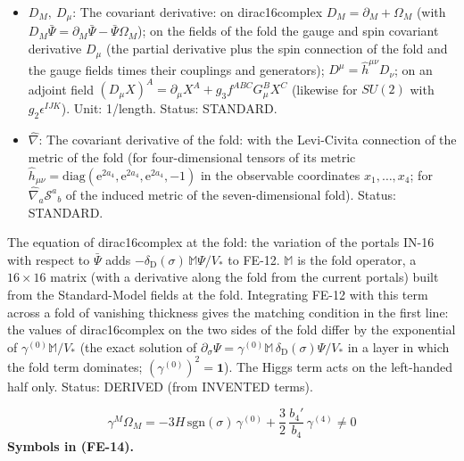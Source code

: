 \documentclass[
  10pt,
]{article}
\begin{document}
\begin{itemize}
\item
  \(D_M,\ D_\mu\): The covariant derivative: on dirac16complex
  \(D_M = \partial_M + \Omega_M\) (with
  \(D_M\bar\Psi = \partial_M\bar\Psi - \bar\Psi\Omega_M\)); on the
  fields of the fold the gauge and spin covariant derivative \(D_\mu\)
  (the partial derivative plus the spin connection of the fold and the
  gauge fields times their couplings and generators);
  \(D^\mu = \hat h^{\mu\nu}D_\nu\); on an adjoint field
  \((D_\mu X)^A = \partial_\mu X^A + g_3f^{ABC}G^B_\mu X^C\) (likewise
  for \(SU(2)\) with \(g_2\epsilon^{IJK}\)). Unit: 1/length. Status:
  STANDARD.
\item
  \(\hat\nabla\): The covariant derivative of the fold: with the
  Levi-Civita connection of the metric of the fold (for four-dimensional
  tensors of its metric
  \(\hat h_{\mu\nu} = \mathrm{diag}(\mathrm{e}^{2a_4}, \mathrm{e}^{2a_4}, \mathrm{e}^{2a_4}, -1)\)
  in the observable coordinates \(x_1, \dots, x_4\); for
  \(\hat\nabla_a\mathcal{S}^a{}_b\) of the induced metric of the
  seven-dimensional fold). Status: STANDARD.
\end{itemize}

The equation of dirac16complex at the fold: the variation of the portals
IN-16 with respect to \(\bar\Psi\) adds
\(-\delta_{\mathrm{D}}(\sigma)\,\mathbb{M}\Psi/V_*\) to FE-12.
\(\mathbb{M}\) is the fold operator, a \(16 \times 16\) matrix (with a
derivative along the fold from the current portals) built from the
Standard-Model fields at the fold. Integrating FE-12 with this term
across a fold of vanishing thickness gives the matching condition in the
first line: the values of dirac16complex on the two sides of the fold
differ by the exponential of \(\gamma^{(0)}\mathbb{M}/V_*\) (the exact
solution of
\(\partial_\sigma\Psi = \gamma^{(0)}\mathbb{M}\,\delta_{\mathrm{D}}(\sigma)\Psi/V_*\)
in a layer in which the fold term dominates;
\((\gamma^{(0)})^2 = \mathbf{1}\)). The Higgs term acts on the
left-handed half only. Status: DERIVED (from INVENTED terms).

\[
\gamma^M\Omega_M = -3H\,\mathrm{sgn}(\sigma)\,\gamma^{(0)} + \frac32\,\frac{b_4'}{b_4}\,\gamma^{(4)} \ne 0 \tag{FE-14}
\] \textbf{Symbols in (FE-14).}
\end{document}
